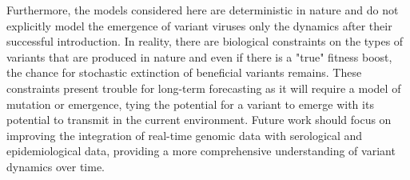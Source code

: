 \documentclass[11pt,oneside,letterpaper]{article}
\begin{document}
Furthermore, the models considered here are deterministic in nature and do not explicitly model the emergence of variant viruses only the dynamics after their successful introduction.
In reality, there are biological constraints on the types of variants that are produced in nature and even if there is a "true" fitness boost, the chance for stochastic extinction of beneficial variants remains.
These constraints present trouble for long-term forecasting as it will require a model of mutation or emergence, tying the potential for a variant to emerge with its potential to transmit in the current environment.
Future work should focus on improving the integration of real-time genomic data with serological and epidemiological data, providing a more comprehensive understanding of variant dynamics over time.



%

\end{document}
